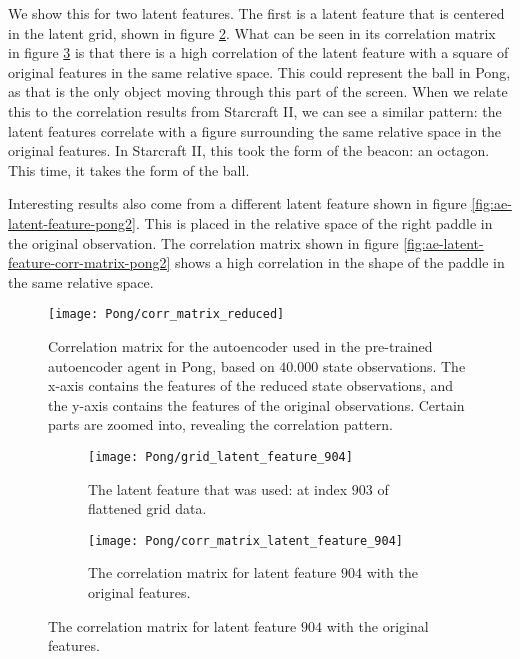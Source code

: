 We show this for two latent features. The first is a latent feature that is centered in the latent grid, shown in figure \ref{fig:ae-latent-feature-pong}. What can be seen in its correlation matrix in figure \ref{fig:ae-latent-feature-corr-matrix-pong} is that there is a high correlation of the latent feature with a square of original features in the same relative space. This could represent the ball in Pong, as that is the only object moving through this part of the screen. When we relate this to the correlation results from Starcraft II, we can see a similar pattern: the latent features correlate with a figure surrounding the same relative space in the original features. In Starcraft II, this took the form of the beacon: an octagon. This time, it takes the form of the ball.

Interesting results also come from a different latent feature shown in figure \ref{fig:ae-latent-feature-pong2}. This is placed in the relative space of the right paddle in the original observation. The correlation matrix shown in figure \ref{fig:ae-latent-feature-corr-matrix-pong2} shows a high correlation in the shape of the paddle in the same relative space.

\begin{figure}[h]
	\centering
	\texttt{[image: Pong/corr\_matrix\_reduced]}
	\caption{Correlation matrix for the autoencoder used in the pre-trained autoencoder agent in Pong, based on $40.000$ state observations. The x-axis contains the features of the reduced state observations, and the y-axis contains the features of the original observations. Certain parts are zoomed into, revealing the correlation pattern.}
	\label{fig:ae-corr-pong}
\end{figure}

\begin{figure}[h]
	\centering
	\begin{subfigure}[b]{0.2\textwidth}
		\texttt{[image: Pong/grid\_latent\_feature\_904]}
		\caption{The latent feature that was used: at index $903$ of flattened grid data.}
		\label{fig:ae-latent-feature-pong} 
	\end{subfigure}\hfill
	\begin{subfigure}[b]{0.75\textwidth}
		\texttt{[image: Pong/corr\_matrix\_latent\_feature\_904]}
		\caption{The correlation matrix for latent feature $904$ with the original features.}
		\label{fig:ae-latent-feature-corr-matrix-pong}
	\end{subfigure}
	\caption{The correlation matrix for latent feature $904$ with the original features.}
	\label{fig:latent-feature-corr-pong}
\end{figure}

